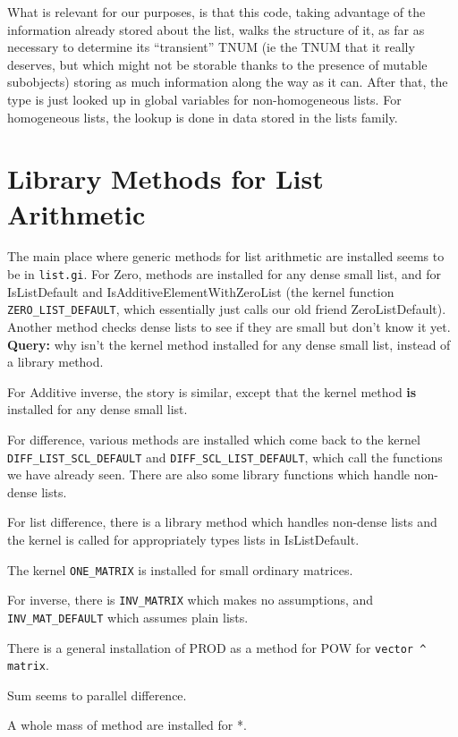 \documentclass{article}
\begin{document}
What is relevant for our purposes, is that this code, taking advantage
of the information already stored about the list, walks the structure
of it, as far as necessary to determine its ``transient'' TNUM (ie
the TNUM that it really deserves, but which might not be storable
thanks to the presence of mutable subobjects) storing as much
information along the way as it can. After that, the type is just
looked up in global variables for non-homogeneous lists. For
homogeneous lists, the lookup is done in data stored in the lists
family. 

\section{Library Methods for List Arithmetic}

The main place where generic methods for list arithmetic are installed
seems to be in \verb|list.gi|. For Zero, methods are installed for any
dense small list, and for IsListDefault and
IsAdditiveElementWithZeroList (the kernel function \verb|ZERO_LIST_DEFAULT|,
which essentially just calls our old friend ZeroListDefault). Another
method checks dense lists to see if they are small but don't know it
yet. \textbf{Query:} why isn't the kernel method installed for any
dense small list, instead of a library method.

For Additive inverse, the story is similar, except that the kernel
method \textbf{is} installed for any dense small list.


For difference, various methods are installed which come back to the
kernel \verb|DIFF_LIST_SCL_DEFAULT| and \verb|DIFF_SCL_LIST_DEFAULT|,
which call the functions we have already seen. There are also some
library functions which handle non-dense lists.

For list difference, there is a library method which handles non-dense
lists and the kernel is called for appropriately types lists in
IsListDefault.

The kernel \verb|ONE_MATRIX| is installed for small ordinary matrices.

For inverse, there is \verb|INV_MATRIX| which makes no assumptions,
and \verb|INV_MAT_DEFAULT| which assumes plain lists.

There is a general installation of PROD as a method for POW for 
\verb|vector ^ matrix|.

Sum seems to parallel difference. 

A whole mass of method are installed for *. 
\end{document}
